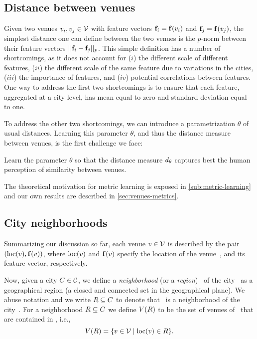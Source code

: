 \subsection{Distance between venues}
Given two venues ${v}_i,{v}_j\in{\cal V}$ with 
feature vectors ${\mathbf{f}}_i = {\mathbf{f}}({v}_i)$ and ${\mathbf{f}}_j = {\mathbf{f}}({v}_j)$, 
the simplest distance one can define between the two venues is
the $p$-norm between their feature vectors $||{\mathbf{f}}_i-{\mathbf{f}}_j||_p$.
This simple definition has a number of shortcomings, as it does not
account for 
($i$) the different scale of different features, 
($ii$) the different scale of the same feature due to variations in the cities, 
($iii$) the importance of features, and 
($iv$) potential correlations between features.
One way to address the first two shortcomings is to ensure that each feature,
aggregated at a city level, has mean equal to zero and standard deviation equal
to one. 

To address the other two shortcomings, we can introduce a parametrization
$\theta$ of usual distances.  Learning this parameter $\theta$, and thus the
distance measure between venues, is the first challenge we face:
\begin{objective}
\label{objective:venue-distance-learning}
Learn the parameter $\theta$ so that the distance measure ${d}_\theta$
captures best the human perception of similarity between venues.  
\end{objective} 
The theoretical motivation for metric learning is exposed in
\autoref{sub:metric-learning} and our
own results are described in \autoref{sec:venues-metrics}.

\subsection{City neighborhoods}
Summarizing our discussion so far, each venue ${v}\in{\cal V}$ is
described by the pair $({\mathrm{loc}}({v}), {\mathbf{f}}({v}))$, where ${\mathrm{loc}}({v})$
and ${\mathbf{f}}({v})$ specify the location of the venue~\venue, and its feature
vector, respectively. 

Now, given a city ${C}\in{\cal C}$, we define a {\em neighborhood} 
(or a {\em region}) \region\ of the city \city\ as a geographical region
(a closed and connected set in the geographical plane).
We abuse notation and we write ${R}\subseteq{C}$ to denote that
\region\ is a neighborhood of the city~\city.
For a neighborhood ${R}\subseteq{C}$ we define ${V}({R})$ to
be the set of venues of \city\ that are
contained in \region, i.e., 
\begin{equation*}
{V}({R}) = \{ {v}\in{\cal V} 
\mid {\mathrm{loc}}({v})\in{R} \}.  
\end{equation*}

